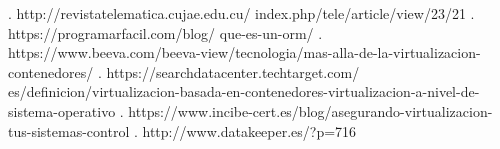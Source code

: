\documentclass[twoside,twocolumn]{article}
\begin{document}
\begin{flushright}
\begin{itemize}
\begin{thebibliography}{99}
. http://revistatelematica.cujae.edu.cu/
index.php/tele/article/view/23/21
 \break
{}. https://programarfacil.com/blog/
que-es-un-orm/
\break
{}. https://www.beeva.com/beeva-view/tecnologia/mas-alla-de-la-virtualizacion-contenedores/
\break
{}. https://searchdatacenter.techtarget.com/
es/definicion/virtualizacion-basada-en-contenedores-virtualizacion-a-nivel-de-sistema-operativo
\break
{}. https://www.incibe-cert.es/blog/asegurando-virtualizacion-tus-sistemas-control
\break
{}. http://www.datakeeper.es/?p=716
\break


\newblock {\em }
 
\end{thebibliography}

\end{itemize}
\end{flushright}
\end{document}
